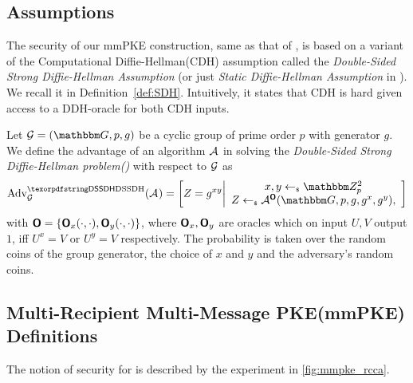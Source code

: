 
\subsection{Assumptions}
The security of our mmPKE construction, same as that of \cite{ASIACCS:PinPoeSch14}, is based on a variant of the Computational
Diffie-Hellman(CDH) assumption called the \emph{Double-Sided Strong Diffie-Hellman Assumption} (or just \emph{Static
  Diffie-Hellman Assumption} in \cite{ASIACCS:PinPoeSch14}). We recall it in Definition~\ref{def:SDH}. Intuitively, it states that
CDH is hard given access to a DDH-oracle for both CDH inputs.

\begin{definition}\label{def:SDH}
  Let $\Group = (\Grp, p, g)$ be a cyclic group of prime order $p$ with generator $g$. We define the advantage of an
  algorithm $\mathcal{A}_{\relax}$ in solving the \emph{Double-Sided Strong Diffie-Hellman problem(\sdh)} with respect to $\mathcal{G}$ as
  \[
    \adv{\sdh}{\Group}(\Adv) =
    \left[
      Z = g^{xy}
      \middle\vert
      \begin{array}{c}
        x, y \getsr \Z_p^2\\
        Z \getsr \Adv^{\oracle{O}}(\Grp,p,g,g^x,g^y),
      \end{array}
    \right]
  \]
with $\textnormal{\textsf{\bfseries O}} = \{\textnormal{\textsf{\bfseries O}}_x(\cdot,\cdot),\textnormal{\textsf{\bfseries O}}_y(\cdot,\cdot)\}$, where $\textnormal{\textsf{\bfseries O}}_x,\textnormal{\textsf{\bfseries O}}_y$ are oracles which on input $U,V$ output $1$, iff $U^x = V$ or $U^y = V$ respectively.
The probability is taken over the random coins of the group generator, the choice of $x$ and $y$ and the adversary's
random coins.
\end{definition}

\subsection{Multi-Recipient Multi-Message PKE(mmPKE) Definitions}\label{app:mmpke}
The notion of \mmindrcca security for \mmPKE is described by the experiment in \cref{fig:mmpke_rcca}.

